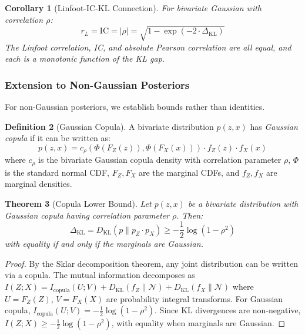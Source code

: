 \documentclass[10pt]{article} %
\theoremstyle{plain}
\newtheorem{theorem}{Theorem}[section]
\newtheorem{corollary}[theorem]{Corollary}
\theoremstyle{definition}
\newtheorem{definition}[theorem]{Definition}
\newcommand{\IC}{\mathrm{IC}}  %
\begin{document}
\begin{corollary}[Linfoot-IC-KL Connection]
\label{cor:linfoot-kl}
For bivariate Gaussian with correlation $\rho$:
\begin{equation}
r_L = \IC = |\rho| = \sqrt{1 - \exp(-2 \cdot \Delta_{\text{KL}})}
\end{equation}
The Linfoot correlation, IC, and absolute Pearson correlation are all equal, and each is a monotonic function of the KL gap.
\end{corollary}

\subsubsection{Extension to Non-Gaussian Posteriors}

For non-Gaussian posteriors, we establish bounds rather than identities.

\begin{definition}[Gaussian Copula]
A bivariate distribution $p(z, x)$ has \emph{Gaussian copula} if it can be written as:
\begin{equation}
p(z, x) = c_\rho(\Phi(F_Z(z)), \Phi(F_X(x))) \cdot f_Z(z) \cdot f_X(x)
\end{equation}
where $c_\rho$ is the bivariate Gaussian copula density with correlation parameter $\rho$, $\Phi$ is the standard normal CDF, $F_Z, F_X$ are the marginal CDFs, and $f_Z, f_X$ are marginal densities.
\end{definition}

\begin{theorem}[Copula Lower Bound]
\label{thm:copula-bound}
Let $p(z, x)$ be a bivariate distribution with Gaussian copula having correlation parameter $\rho$. Then:
\begin{equation}
\Delta_{\text{KL}} = D_{\text{KL}}(p \| p_Z \cdot p_X) \geq -\frac{1}{2}\log(1 - \rho^2)
\end{equation}
with equality if and only if the marginals are Gaussian.
\end{theorem}

\begin{proof}
By the Sklar decomposition theorem, any joint distribution can be written via a copula. The mutual information decomposes as $I(Z; X) = I_{\text{copula}}(U; V) + D_{\text{KL}}(f_Z \| \mathcal{N}) + D_{\text{KL}}(f_X \| \mathcal{N})$ where $U = F_Z(Z)$, $V = F_X(X)$ are probability integral transforms. For Gaussian copula, $I_{\text{copula}}(U; V) = -\frac{1}{2}\log(1-\rho^2)$. Since KL divergences are non-negative, $I(Z; X) \geq -\frac{1}{2}\log(1-\rho^2)$, with equality when marginals are Gaussian.
\end{proof}
\end{document}
